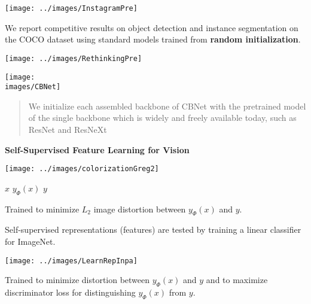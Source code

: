 {

\centerline{\texttt{[image: ../images/InstagramPre]}}


We report competitive results on object detection and instance segmentation on the COCO dataset using standard
models trained from {\bf random initialization}.



\centerline{\texttt{[image: ../images/RethinkingPre]}}


\centerline{\texttt{[image: \\images/CBNet]}}



\begin{quotation}
We initialize each assembled backbone of CBNet with the pretrained model of the single backbone which is widely and
freely available today, such as ResNet and ResNeXt
\end{quotation}

\slide{}

\centerline{\bf Self-Supervised Feature Learning for Vision}

\vfill
\vfill


\vfill
\centerline{\texttt{[image: ../images/colorizationGreg2]}}
\centerline{$x$ \hspace{4em} $y_\Phi(x)$ \hspace{4em} $y$}

\vfill
Trained to minimize $L_2$ image distortion between $y_\Phi(x)$ and $y$.


Self-supervised representations (features) are tested by training a {\color{red} linear} classifier for ImageNet.


\centerline{\texttt{[image: ../images/LearnRepInpa]}}

Trained to minimize distortion between $y_\Phi(x)$ and $y$ and to {\color{red} maximize} discriminator loss for distinguishing $y_\Phi(x)$ from $y$.

}
